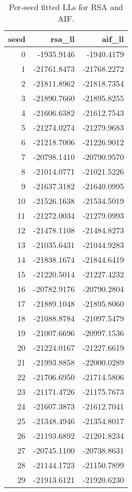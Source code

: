 \begin{table}[!ht]
\centering
\begin{table}
\caption{Per-seed fitted LLs for RSA and AIF.}
\label{tab:fig13}
\begin{tabular}{rrr}
\toprule
seed & rsa\_ll & aif\_ll \\
\midrule
0 & -1935.9146 & -1940.4179 \\
1 & -21761.8473 & -21768.2272 \\
2 & -21811.8962 & -21818.7354 \\
3 & -21890.7660 & -21895.8255 \\
4 & -21606.6382 & -21612.7543 \\
5 & -21274.0274 & -21279.9683 \\
6 & -21218.7006 & -21226.9012 \\
7 & -20798.1410 & -20790.9570 \\
8 & -21014.0771 & -21021.5226 \\
9 & -21637.3182 & -21640.0995 \\
10 & -21526.1638 & -21534.5019 \\
11 & -21272.0034 & -21279.0993 \\
12 & -21478.1108 & -21484.8273 \\
13 & -21035.6431 & -21044.9283 \\
14 & -21838.1674 & -21844.6419 \\
15 & -21220.5014 & -21227.4232 \\
16 & -20782.9176 & -20790.2804 \\
17 & -21889.1048 & -21895.8060 \\
18 & -21088.8784 & -21097.5479 \\
19 & -21007.6696 & -20997.1536 \\
20 & -21224.0167 & -21227.6619 \\
21 & -21993.8858 & -22000.0289 \\
22 & -21706.6950 & -21714.5806 \\
23 & -21171.4726 & -21175.7673 \\
24 & -21607.3873 & -21612.7041 \\
25 & -21348.4946 & -21354.8017 \\
26 & -21193.6892 & -21201.8234 \\
27 & -20745.1100 & -20738.8631 \\
28 & -21144.1723 & -21150.7899 \\
29 & -21913.6121 & -21920.6230 \\
\bottomrule
\end{tabular}
\end{table}
\end{table}
